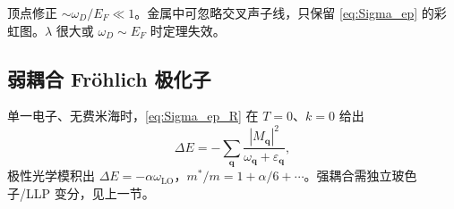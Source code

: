 顶点修正 $\sim\omega_D/E_F\ll1$。金属中可忽略交叉声子线，只保留 \eqref{eq:Sigma_ep} 的彩虹图。$\lambda$ 很大或 $\omega_D\sim E_F$ 时定理失效。

\subsection{弱耦合 Fröhlich 极化子}

单一电子、无费米海时，\eqref{eq:Sigma_ep_R} 在 $T=0$、$k=0$ 给出
\begin{equation}
  \Delta E=-\sum_{\mathbf{q}}\frac{|M_{\mathbf{q}}|^2}{\omega_{\mathbf{q}}+\varepsilon_{\mathbf{q}}},
\end{equation}
极性光学模积出 $\Delta E=-\alpha\omega_{\mathrm{LO}}$，$m^*/m=1+\alpha/6+\cdots$。强耦合需独立玻色子/LLP 变分，见上一节。
